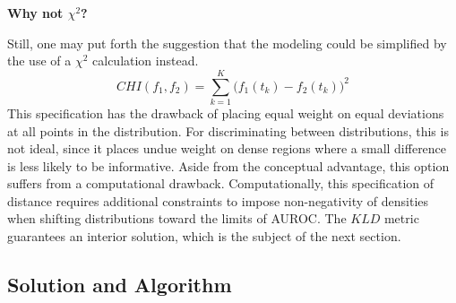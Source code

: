 



\textbf{Why not $\chi^2$?}

Still, one may put forth the suggestion that the modeling could be simplified by the use of a $\chi^2$ calculation instead.
%
%
\begin{equation}
    CHI(f_1, f_2) = \sum_{k = 1}^{K} \bigg( f_1(t_k) - f_2(t_k) \bigg)^2
\end{equation}
%
This specification has the drawback of placing equal weight on equal deviations at all points in the distribution.
For discriminating between distributions, this is not ideal, since it places undue weight on dense regions where a small difference is less likely to be informative.
%
Aside from the conceptual advantage, this option suffers from a computational drawback.
Computationally, this specification of distance requires additional constraints to impose non-negativity of densities when shifting distributions toward the limits of AUROC.
The $KLD$ metric guarantees an interior solution, which is the subject of the next section.









\subsection{Solution and Algorithm}

